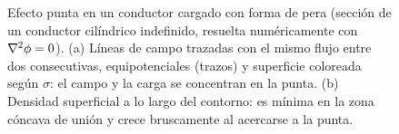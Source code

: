 \begin{figure}[t]
\caption{Efecto punta en un conductor cargado con forma de pera (sección de un conductor cilíndrico indefinido, resuelta numéricamente con
$\nabla^{2}\phi=0$). (a) Líneas de campo trazadas con el mismo flujo entre dos consecutivas, equipotenciales (trazos) y superficie coloreada según
$\sigma$: el campo y la carga se concentran en la punta. (b) Densidad superficial a lo largo del contorno: es mínima en la zona cóncava de
unión y crece bruscamente al acercarse a la punta.}
\label{fig:punta}
\end{figure}
